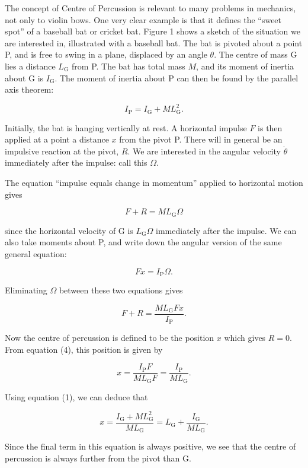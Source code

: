   The concept of Centre of Percussion is relevant to many problems in 
  mechanics, not only to violin bows. One very clear example is that it defines 
  the ``sweet spot'' of a baseball bat or cricket bat. Figure 1 shows a sketch 
  of the situation we are interested in, illustrated with a baseball bat. The 
  bat is pivoted about a point P, and is free to swing in a plane, displaced by 
  an angle $\theta$. The centre of mass G lies a distance $L_{\mathrm{G}}$ from 
  P. The bat has total mass $M$, and its moment of inertia about G is 
  $I_{\mathrm{G}}$. The moment of inertia about P can then be found by the 
  parallel axis theorem: 

  $$I_{\mathrm{P}}=I_{\mathrm{G}}+ML_{\mathrm{G}}^2. \tag{1}$$ 

  Initially, the bat is hanging vertically at rest. A horizontal impulse $F$ is 
  then applied at a point a distance $x$ from the pivot P. There will in 
  general be an impulsive reaction at the pivot, $R$. We are interested in the 
  angular velocity $\dot{\theta}$ immediately after the impulse: call this 
  $\Omega$. 

  The equation ``impulse equals change in momentum'' applied to horizontal 
  motion gives 

  $$F+R=M L_{\mathrm{G}} \Omega \tag{2}$$ 

  since the horizontal velocity of G is $L_{\mathrm{G}} \Omega$ immediately 
  after the impulse. We can also take moments about P, and write down the 
  angular version of the same general equation: 

  $$Fx=I_{\mathrm{P}} \Omega . \tag{3}$$ 

  Eliminating $\Omega$ between these two equations gives 

  $$ F+R=\frac{ML_{\mathrm{G}}Fx}{I_{\mathrm{P}}} . \tag{4}$$ 

  Now the centre of percussion is defined to be the position $x$ which gives 
  $R=0$. From equation (4), this position is given by 

  
  $$x=\frac{I_{\mathrm{P}}F}{ML_{\mathrm{G}}F}=\frac{I_{\mathrm{P}}}{ML_{\mathrm{G}}}. 
  \tag{5}$$ 

  Using equation (1), we can deduce that 

  $$x=\frac{I_{\mathrm{G}}+ML_{\mathrm{G}}^2}{ML_{\mathrm{G}}} = 
  L_{\mathrm{G}}+\frac{I_{\mathrm{G}}}{ML_{\mathrm{G}}}. \tag{6}$$ 

  Since the final term in this equation is always positive, we see that the 
  centre of percussion is always further from the pivot than G. 


